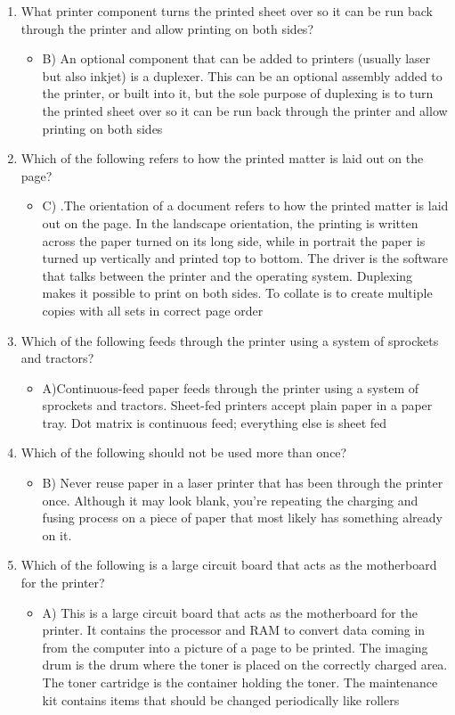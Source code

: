 \documentclass{article}
\begin{document}
\begin{enumerate}
\begin{itemize}
    \end{itemize}
     \item What printer component turns the printed sheet over so it can be run back through the
printer and allow printing on both sides?
    \begin{itemize}
        \item B) An optional component that can be added to printers (usually laser but also inkjet) is a duplexer. This can be an optional assembly added to the printer, or built into it, but the sole purpose of duplexing is to turn the printed sheet over so it can be run back through the printer and allow printing on both sides
    \end{itemize}
     \item Which of the following refers to how the printed matter is laid out on the page?
    \begin{itemize}
        \item C) .The orientation of a document refers to how the printed matter is laid out on the page. In the landscape orientation, the printing is written across the paper turned on its long side, while in portrait the paper is turned up vertically and printed top to bottom. The driver is the software that talks between the printer and the operating system. Duplexing makes it possible to print on both sides. To collate is to create multiple copies with all sets in correct page order
    \end{itemize}
     \item Which of the following feeds through the printer using a system of sprockets and tractors?
    \begin{itemize}
        \item A)Continuous-feed paper feeds through the printer using a system of sprockets and tractors. Sheet-fed printers accept plain paper in a paper tray. Dot matrix is continuous feed; everything else is sheet fed
    \end{itemize}
     \item Which of the following should not be used more than once?
    \begin{itemize}
        \item B) Never reuse paper in a laser printer that has been through the printer once. Although it may look blank, you’re repeating the charging and fusing process on a piece of paper that most likely has something already on it.
    \end{itemize}
     \item Which of the following is a large circuit board that acts as the motherboard for the printer?
    \begin{itemize}
        \item A) This is a large circuit board that acts as the motherboard for the printer. It contains the processor and RAM to convert data coming in from the computer into a picture of a page to be printed. The imaging drum is the drum where the toner is placed on the correctly charged area. The toner cartridge is the container holding the toner. The maintenance kit contains items that should be changed periodically like rollers
    \end{itemize}
\end{enumerate}
\end{document}
